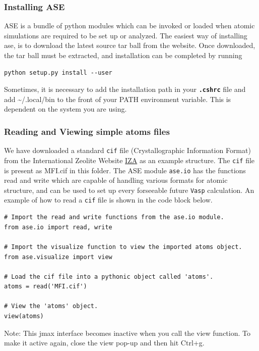 \documentclass[11pt]{article}
\begin{document}
\subsubsection{Installing ASE}
\label{sec-2-3-1}
ASE is a bundle of python modules which can be invoked or loaded when atomic simulations are required to be set up or analyzed. The easiest way of installing ase, is to download the latest source tar ball from the website. Once downloaded, the tar ball must be extracted, and installation can be completed by running 

\begin{verbatim}
python setup.py install --user
\end{verbatim}

Sometimes, it is necessary to add the installation path in your \textbf{\texttt{.cshrc}} file and add \textasciitilde{}/.local/bin to the front of your PATH environment variable. This is dependent on the system you are using. 

\subsubsection{Reading and Viewing simple atoms files}
\label{sec-2-3-2}
We have downloaded a standard \texttt{cif} file (Crystallographic Information Format) from the International Zeolite Website \href{http://www.iza-online.org/}{IZA} as an example structure. The \texttt{cif} file is present as MFI.cif in this folder. 
The ASE module \texttt{ase.io} has the functions read and write which are capable of handling various formats for atomic structure, and can be used to set up every forseeable future \texttt{Vasp} calculation. An example of how to read a \texttt{cif} file is shown in the code block below.

\begin{verbatim}
# Import the read and write functions from the ase.io module.
from ase.io import read, write

# Import the visualize function to view the imported atoms object.
from ase.visualize import view

# Load the cif file into a pythonic object called 'atoms'.
atoms = read('MFI.cif')

# View the 'atoms' object.
view(atoms)
\end{verbatim}

Note: This jmax interface becomes inactive when you call the view function. To make it active again, close the view pop-up and then hit Ctrl+g.
\end{document}

